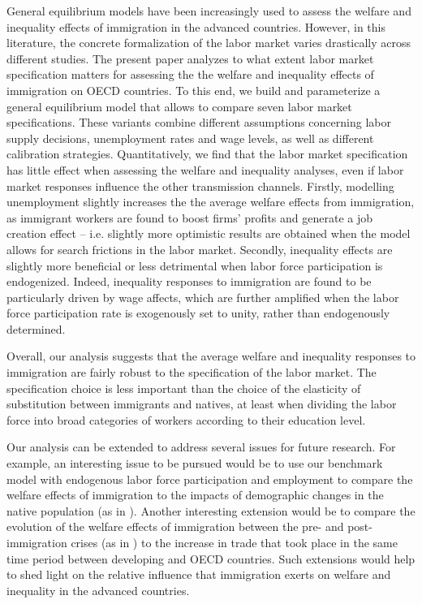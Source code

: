 \documentclass[a4paper,12pt]{article}
\begin{document}
General equilibrium models have been increasingly used to assess the welfare and inequality effects of immigration in the advanced countries. However, in this literature, the concrete formalization of the labor market varies drastically across different studies. The present paper analyzes to what extent labor market specification matters for assessing the the welfare and inequality effects of immigration on OECD countries. To this end, we build and parameterize a general equilibrium model that allows to compare seven labor market specifications. These variants combine different assumptions concerning labor supply decisions, unemployment rates and wage levels, as well as different calibration strategies. Quantitatively, we find that the labor market specification has little effect when assessing the welfare and inequality analyses, even if labor market responses influence the other transmission channels. Firstly, modelling unemployment slightly increases the the average welfare effects from immigration, as immigrant workers are found to boost firms' profits and generate a job creation effect -- i.e. slightly more optimistic results are obtained when the model allows for search frictions in the labor market. Secondly, inequality effects are slightly more beneficial or less detrimental when labor force participation is endogenized. Indeed, inequality responses to immigration are found to be particularly driven by wage affects, which are further amplified when the labor force participation rate is exogenously set to unity, rather than endogenously determined.

Overall, our analysis suggests that the average welfare and inequality responses to immigration are fairly robust to the specification of the labor market. The specification choice is less important than the choice of the elasticity of substitution between immigrants and natives, at least when dividing the labor force into broad categories of workers according to their education level.

Our analysis can be extended to address several issues for future research. For example, an interesting issue to be pursued would be to use our benchmark model with endogenous labor force participation and employment to compare the welfare effects of immigration to the impacts of demographic changes in the native population (as in \cite{Docquier2019}). Another interesting extension would be to compare the evolution of the welfare effects of immigration between the pre- and post- immigration crises (as in \cite{Burzynski2018}) to the increase in trade that took place in the same time period between developing and OECD countries. Such extensions would help to shed light on the relative influence that immigration exerts on welfare and inequality in the advanced countries.
\end{document}
